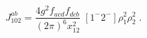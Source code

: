 \begin{equation}\label{defj12}
  J_{102}^{ab} = \frac{4g^2f_{acd}f_{dcb}}{(2\pi)^{6} x_{12}^2} \; [1^-2^-]\rho_1^2\rho_2^2\;.
\end{equation}


